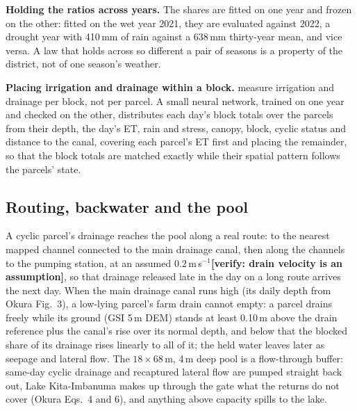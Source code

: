 \documentclass{article}
\newcommand{\verify}[1]{{\color{orange!85!black}\textbf{[verify: #1]}}}
\begin{document}
\begin{added}
\textbf{Holding the ratios across years.} The shares are fitted on one year and frozen on the other: fitted on the wet year 2021, they are evaluated against 2022, a drought year with 410\,mm of rain against a 638\,mm thirty-year mean, and vice versa. A law that holds across so different a pair of seasons is a property of the district, not of one season's weather.

\textbf{Placing irrigation and drainage within a block.} \cite{Okura2025WaterBalance} measure irrigation and drainage per block, not per parcel. A small neural network, trained on one year and checked on the other, distributes each day's block totals over the parcels from their depth, the day's ET, rain and stress, canopy, block, cyclic status and distance to the canal, covering each parcel's ET first and placing the remainder, so that the block totals are matched exactly while their spatial pattern follows the parcels' state.

\subsection{Routing, backwater and the pool}
A cyclic parcel's drainage reaches the pool along a real route: to the nearest mapped channel connected to the main drainage canal, then along the channels to the pumping station, at an assumed $0.2$\,m\,s$^{-1}$\verify{drain velocity is an assumption}, so that drainage released late in the day on a long route arrives the next day. When the main drainage canal runs high (its daily depth from Okura Fig.~3), a low-lying parcel's farm drain cannot empty: a parcel drains freely while its ground (GSI 5\,m DEM) stands at least 0.10\,m above the drain reference plus the canal's rise over its normal depth, and below that the blocked share of its drainage rises linearly to all of it; the held water leaves later as seepage and lateral flow. The $18\times68$\,m, 4\,m deep pool is a flow-through buffer: same-day cyclic drainage and recaptured lateral flow are pumped straight back out, Lake Kita-Imbanuma makes up through the gate what the returns do not cover (Okura Eqs.~4 and 6), and anything above capacity spills to the lake.


\end{added}
\end{document}
